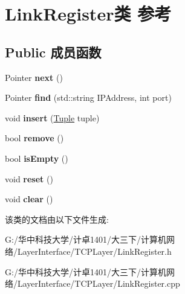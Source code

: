 \hypertarget{class_link_register}{}\section{Link\+Register类 参考}
\label{class_link_register}
\subsection*{Public 成员函数}
\begin{DoxyCompactItemize}
\item 
\mbox{\label{class_link_register_a43763a33de2304f53bfd11e7d3e90491}} 
Pointer {\bfseries next} ()
\item 
\mbox{\label{class_link_register_abe4840e598dc18dee95cd979513160aa}} 
Pointer {\bfseries find} (std\+::string I\+P\+Address, int port)
\item 
\mbox{\label{class_link_register_a937e313ea63312bd9636c978554e180c}} 
void {\bfseries insert} (\hyperlink{class_tuple}{Tuple} tuple)
\item 
\mbox{\label{class_link_register_ac894e7263eeeeb67bc6cfa8f37c18713}} 
bool {\bfseries remove} ()
\item 
\mbox{\label{class_link_register_a5770b48622c38dadecca356406b6ed47}} 
bool {\bfseries is\+Empty} ()
\item 
\mbox{\label{class_link_register_aac227d321f4fed2ebd7b661eb554604b}} 
void {\bfseries reset} ()
\item 
\mbox{\label{class_link_register_a1af4133a7b637815860d3efb4e84d3f3}} 
void {\bfseries clear} ()
\end{DoxyCompactItemize}


该类的文档由以下文件生成\+:\begin{DoxyCompactItemize}
\item 
G\+:/华中科技大学/计卓1401/大三下/计算机网络/\+Layer\+Interface/\+T\+C\+P\+Layer/Link\+Register.\+h\item 
G\+:/华中科技大学/计卓1401/大三下/计算机网络/\+Layer\+Interface/\+T\+C\+P\+Layer/Link\+Register.\+cpp\end{DoxyCompactItemize}
